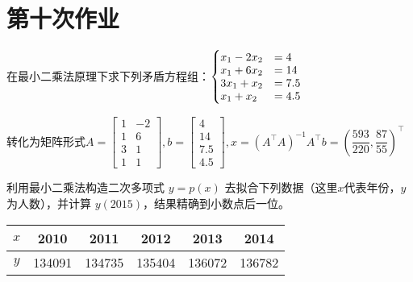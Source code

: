 \chapter{第十次作业}

    \begin{homework}[6pts]
        在最小二乘法原理下求下列矛盾方程组：$\begin{cases}x_1-2x_2&=4\vspace{-0.1cm}\\x_1+6x_2&=14\vspace{-0.1cm}\\3x_1+x_2&=7.5\vspace{-0.1cm}\\x_1+x_2&=4.5\end{cases}$
    \end{homework}

    \begin{solution}
        转化为矩阵形式$A=\begin{bmatrix}1&-2\\1&6\\3&1\\1&1\end{bmatrix},b=\begin{bmatrix}4\\14\\7.5\\4.5\end{bmatrix},x=(A^{\top}A)^{-1}A^{\top}b=\left(\dfrac{593}{220},\dfrac{87}{55}\right)^{\top}$
    \end{solution}

    \begin{homework}[8pts]
        利用最小二乘法构造二次多项式 $y=p(x)$ 去拟合下列数据（这里$x$代表年份，$y$为人数），并计算 $y(2015)$，结果精确到小数点后一位。

        \begin{table}[H]
            \centering
            \begin{tabular}{|c|c|c|c|c|c|}
                \hline
                $x$ & 2010 & 2011 & 2012 & 2013 & 2014 \\
                \hline
                $y$ & 134091 & 134735 & 135404 & 136072 & 136782 \\
                \hline
            \end{tabular}
            \label{tab:1}
        \end{table}
    \end{homework}

